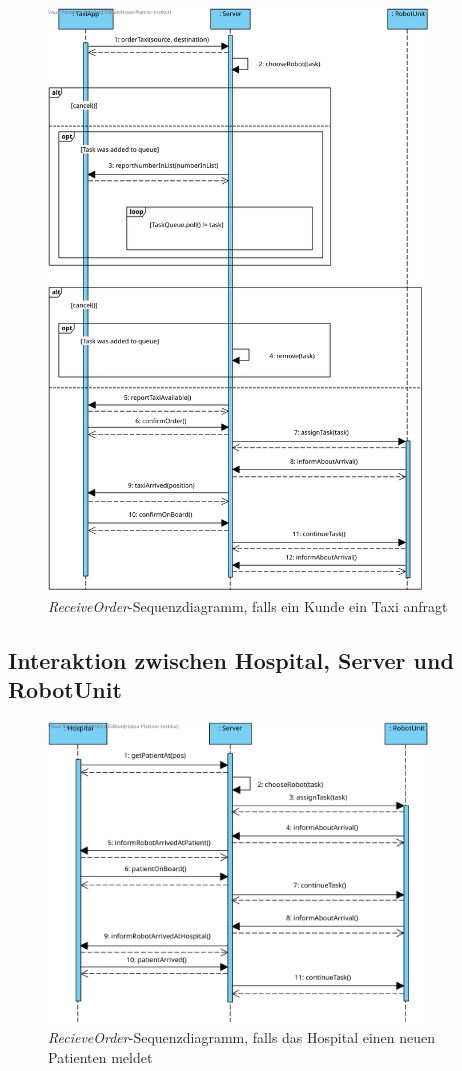 \begin{figure}[H]
	\centering
	\includegraphics[width=0.9\textwidth]{img/2-Entwurf-ReceiveOrder-Taxi}
	\caption{\emph{ReceiveOrder}-Sequenzdiagramm, falls ein Kunde ein Taxi anfragt}
	\label{SequenzDiagrammInteraktionTaxi}
\end{figure}

\subsection*{Interaktion zwischen Hospital, Server und RobotUnit}

\begin{figure}[H]
	\centering
	\includegraphics[width=0.9\textwidth]{img/2-Entwurf-ReceiveOrder-Hosp}
	\caption{\emph{RecieveOrder}-Sequenzdiagramm, falls das Hospital einen neuen Patienten meldet}
	\label{SequenzDiagrammInteraktionHospital}
\end{figure}


